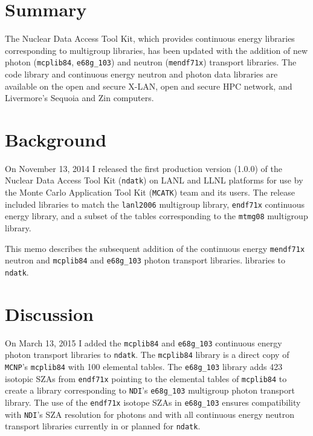 \documentclass[12pt]{lamemo}
\date{May 18, 2015}
\newcommand{\ndatk}{\texttt{ndatk}}
\newcommand{\MCATK}{\texttt{MCATK}}
\newcommand{\NDI}{\texttt{NDI}}
\newcommand{\MCNP}{\texttt{MCNP}}
\begin{document}
\lstset{language=C++}

\maketitle			%

\section{Summary}
The Nuclear Data Access Tool Kit, which provides continuous energy
libraries corresponding to multigroup libraries, has been updated with
the addition of new photon (\texttt{mcplib84}, \texttt{e68g\_103}) and
neutron (\texttt{mendf71x}) transport libraries.  The code library and
continuous energy neutron and photon data libraries are available on
the open and secure X-LAN, open and secure HPC network, and
Livermore's Sequoia and Zin computers.

\section{Background}

On November 13, 2014 I released the first production version (1.0.0)
of the Nuclear Data Access Tool Kit\cite{gray14} (\ndatk) on LANL and
LLNL platforms for use by the Monte Carlo Application Tool
Kit\cite{adams14} (\MCATK) team and its users.  The release included
libraries to match the \texttt{lanl2006}\cite{white07} multigroup
library, \texttt{endf71x}\cite{conlin13} continuous energy library,
and a subset\cite{lee13} of the tables corresponding to the
\texttt{mtmg08}\cite{white09} multigroup library.

This memo describes the subsequent addition of the continuous energy
\texttt{mendf71x} neutron and \texttt{mcplib84} and \texttt{e68g\_103}
photon transport libraries.
libraries to \ndatk.
\newpage

\section{Discussion}

On March 13, 2015 I added the \texttt{mcplib84} and \texttt{e68g\_103}
continuous energy photon transport libraries to \ndatk.  The
\texttt{mcplib84} library is a direct copy of \MCNP's
\texttt{mcplib84}\cite{white12} with 100 elemental tables.  The
\texttt{e68g\_103} library adds 423 isotopic SZAs from
\texttt{endf71x} pointing to the elemental tables of \texttt{mcplib84}
to create a library corresponding to \NDI's
\texttt{e68g\_103}\cite{white05} multigroup photon transport library.
The use of the \texttt{endf71x} isotope SZAs in \texttt{e68g\_103}
ensures compatibility with \NDI's SZA resolution for photons and with
all continuous energy neutron transport libraries currently in or
planned for \ndatk.
\end{document}
